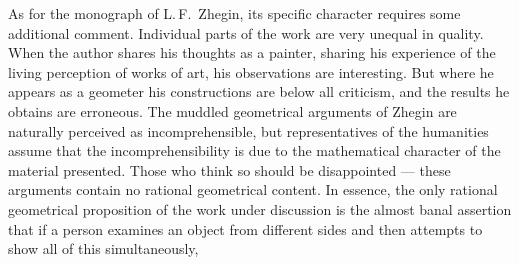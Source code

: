 As for the monograph of L.\,F.~Zhegin, its specific character requires some
additional comment.  Individual parts of the work are very unequal in quality.  When
the author shares his thoughts as a painter, sharing his experience of the living
perception of works of art, his observations are interesting.  But where he appears
as a geometer his constructions are below all criticism, and the results he obtains
are erroneous.  The muddled geometrical arguments of Zhegin are naturally perceived
as incomprehensible, but representatives of the humanities assume that the
incomprehensibility is due to the mathematical character of the material presented.
Those who think so should be disappointed --- these arguments contain no rational
geometrical content.  In essence, the only rational geometrical proposition of the
work under discussion is the almost banal assertion that if a person examines an
object from different sides and then attempts to show all of this simultaneously,
